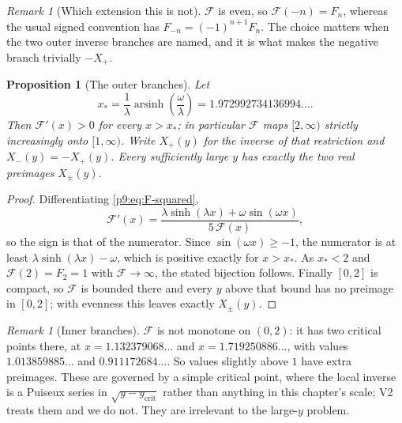 \documentclass[11pt,a4paper,oneside]{book}
\theoremstyle{plain}
\newtheorem{proposition}[theorem]{Proposition}
\theoremstyle{definition}
\theoremstyle{remark}
\newtheorem{remark}[theorem]{Remark}
\begin{document}
\begin{remark}[Which extension this is not]\label{p9:rem:not-signed}
$\mathcal{F}$ is even, so $\mathcal{F}(-n)=F_n$, whereas the usual signed
convention has $F_{-n}=(-1)^{n+1}F_n$.  The choice matters when the two outer
inverse branches are named, and it is what makes the negative branch trivially
$-X_+$.
\end{remark}

\begin{proposition}[The outer branches]\label{p9:prop:branches}
Let
\begin{equation}\label{p9:eq:xstar}
 x_{*}=\frac1\lambda\operatorname{arsinh}\!\left(\frac\omega\lambda\right)
 =1.972992734136994\ldots .
\end{equation}
Then $\mathcal{F}'(x)>0$ for every $x>x_{*}$; in particular $\mathcal{F}$ maps
$[2,\infty)$ strictly increasingly onto $[1,\infty)$.  Write $X_+(y)$ for the
inverse of that restriction and $X_-(y)=-X_+(y)$.  Every sufficiently large
$y$ has exactly the two real preimages $X_\pm(y)$.
\end{proposition}

\begin{proof}
Differentiating \eqref{p9:eq:F-squared},
\begin{equation}\label{p9:eq:F-derivative}
 \mathcal{F}'(x)
 =\frac{\lambda\sinh(\lambda x)+\omega\sin(\omega x)}{5\,\mathcal{F}(x)},
\end{equation}
so the sign is that of the numerator.  Since $\sin(\omega x)\ge-1$,
the numerator is at least $\lambda\sinh(\lambda x)-\omega$, which is positive
exactly for $x>x_{*}$.  As $x_{*}<2$ and $\mathcal{F}(2)=F_2=1$ with
$\mathcal{F}\to\infty$, the stated bijection follows.  Finally $[0,2]$ is
compact, so $\mathcal{F}$ is bounded there and every $y$ above that bound has
no preimage in $[0,2]$; with evenness this leaves exactly $X_\pm(y)$.
\end{proof}

\begin{remark}[Inner branches]\label{p9:rem:inner}
$\mathcal{F}$ is not monotone on $(0,2)$: it has two critical points there, at
$x=1.132379068\ldots$ and $x=1.719250886\ldots$, with values
$1.013859885\ldots$ and $0.911172684\ldots$.  So values slightly above $1$
have extra preimages.  These are governed by a simple critical point, where
the local inverse is a Puiseux series in $\sqrt{y-y_{\mathrm{crit}}}$ rather
than anything in this chapter's scale; V2 treats them and we do not.  They are
irrelevant to the large-$y$ problem.
\end{remark}
\end{document}
